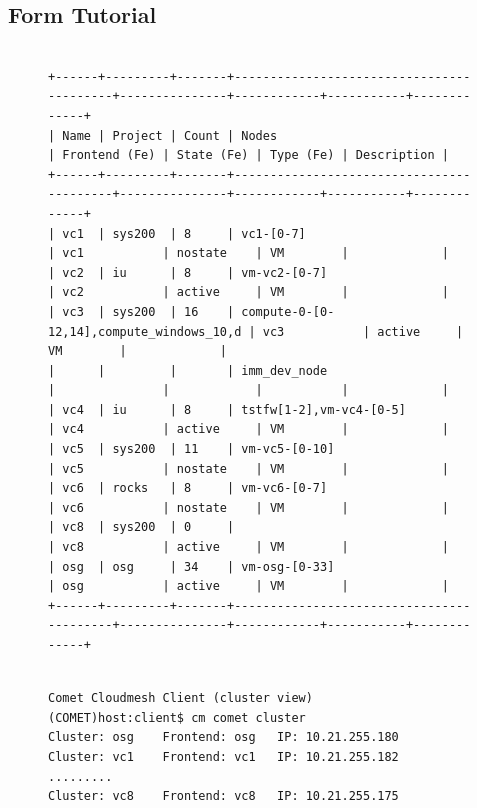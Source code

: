 \subsection{Form Tutorial}

\begin{figure}[htb] 
\begin{small}
\begin{verbatim}

+------+---------+-------+------------------------------------------+---------------+------------+-----------+-------------+
| Name | Project | Count | Nodes                                    | Frontend (Fe) | State (Fe) | Type (Fe) | Description |
+------+---------+-------+------------------------------------------+---------------+------------+-----------+-------------+
| vc1  | sys200  | 8     | vc1-[0-7]                                | vc1           | nostate    | VM        |             |
| vc2  | iu      | 8     | vm-vc2-[0-7]                             | vc2           | active     | VM        |             |
| vc3  | sys200  | 16    | compute-0-[0-12,14],compute_windows_10,d | vc3           | active     | VM        |             |
|      |         |       | imm_dev_node                             |               |            |           |             |
| vc4  | iu      | 8     | tstfw[1-2],vm-vc4-[0-5]                  | vc4           | active     | VM        |             |
| vc5  | sys200  | 11    | vm-vc5-[0-10]                            | vc5           | nostate    | VM        |             |
| vc6  | rocks   | 8     | vm-vc6-[0-7]                             | vc6           | nostate    | VM        |             |
| vc8  | sys200  | 0     |                                          | vc8           | active     | VM        |             |
| osg  | osg     | 34    | vm-osg-[0-33]                            | osg           | active     | VM        |             |
+------+---------+-------+------------------------------------------+---------------+------------+-----------+-------------+
\end{verbatim}
\end{small}
\end{figure}

\begin{figure}[htb] 
\begin{small}
\begin{verbatim}

Comet Cloudmesh Client (cluster view)
(COMET)host:client$ cm comet cluster
Cluster: osg	Frontend: osg	IP: 10.21.255.180
Cluster: vc1	Frontend: vc1	IP: 10.21.255.182
.........
Cluster: vc8	Frontend: vc8	IP: 10.21.255.175
\end{verbatim}
\end{small}
\end{figure}

